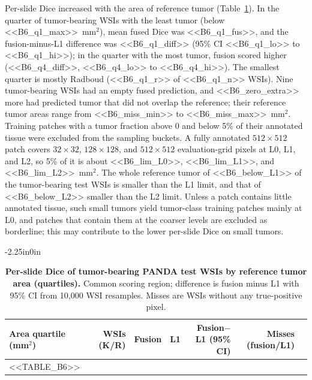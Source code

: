 \documentclass[10pt,letterpaper]{article}
\begin{document}
Per-slide Dice increased with the area of reference tumor (Table~\ref{tab:size}). In the quarter of tumor-bearing WSIs with the least tumor (below <<B6_q1_max>>~mm$^2$), mean fused Dice was <<B6_q1_fus>>, and the fusion-minus-L1 difference was <<B6_q1_diff>> (95\% CI <<B6_q1_lo>> to <<B6_q1_hi>>); in the quarter with the most tumor, fusion scored higher (<<B6_q4_diff>>, <<B6_q4_lo>> to <<B6_q4_hi>>). The smallest quarter is mostly Radboud (<<B6_q1_r>> of <<B6_q1_n>> WSIs). Nine tumor-bearing WSIs had an empty fused prediction, and <<B6_zero_extra>> more had predicted tumor that did not overlap the reference; their reference tumor areas range from <<B6_miss_min>> to <<B6_miss_max>>~mm$^2$. Training patches with a tumor fraction above 0 and below 5\% of their annotated tissue were excluded from the sampling buckets. A fully annotated $512\times512$ patch covers $32\times32$, $128\times128$, and $512\times512$ evaluation-grid pixels at L0, L1, and L2, so 5\% of it is about <<B6_lim_L0>>, <<B6_lim_L1>>, and <<B6_lim_L2>>~mm$^2$. The whole reference tumor of <<B6_below_L1>> of the tumor-bearing test WSIs is smaller than the L1 limit, and that of <<B6_below_L2>> smaller than the L2 limit. Unless a patch contains little annotated tissue, such small tumors yield tumor-class training patches mainly at L0, and patches that contain them at the coarser levels are excluded as borderline; this may contribute to the lower per-slide Dice on small tumors.

\begin{table}[H]\begin{adjustwidth}{-2.25in}{0in}\centering
\caption{\textbf{Per-slide Dice of tumor-bearing PANDA test WSIs by reference tumor area (quartiles).} Common scoring region; difference is fusion minus L1 with 95\% CI from 10,000 WSI resamples. Misses are WSIs without any true-positive pixel.}\label{tab:size}
\begin{tabular}{lrrrrrr}\toprule
Area quartile (mm$^2$) & WSIs (K/R) & Fusion & L1 & Fusion$-$L1 (95\% CI) & Misses (fusion/L1)\\\midrule
<<TABLE_B6>>\bottomrule
\end{tabular}\end{adjustwidth}\end{table}
\end{document}
